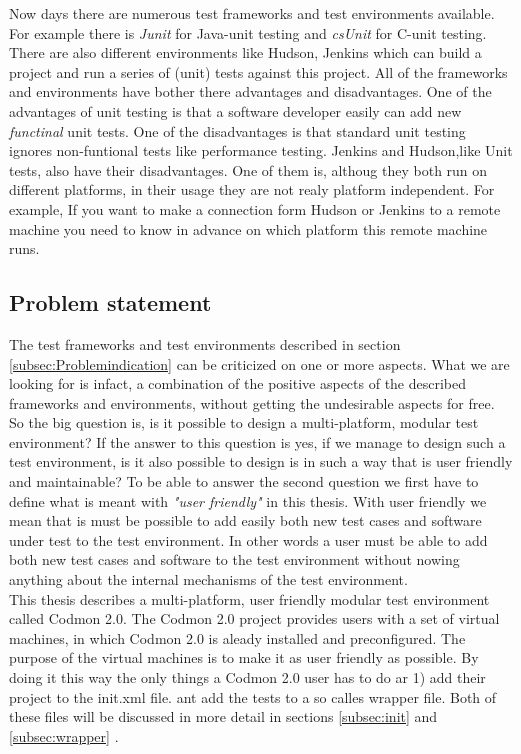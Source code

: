 \documentclass[a4paper,10pt]{scrartcl}
\newcommand{\project}{Codmon 2.0}
\newcommand{\CS}{C\nolinebreak\hspace{-.05em}\raisebox{.6ex}{\bf \#}}
\begin{document}
Now days there are numerous test frameworks and test environments available. For example there is \emph{Junit} for Java-unit testing and \emph{csUnit} for \CS{}-unit testing.
There are also different environments like Hudson, Jenkins which can build a project and run a series of (unit) tests against this project. All of the frameworks
and environments have bother there advantages and disadvantages. One of the advantages of unit testing is that a software developer easily can add new \emph{functinal} unit tests.
One of the disadvantages is that standard unit testing ignores non-funtional tests like performance testing. Jenkins and Hudson,like Unit tests, also have their
disadvantages. One of them is, althoug they both run on different platforms, in their usage they are not realy platform independent. For example, If you want
to make a connection form Hudson or Jenkins to a remote machine you need to know in advance on which platform this remote machine runs. 

\subsection{Problem statement}
\label{subsec:Problemstatement}
The test frameworks and test environments described in section \ref{subsec:Problemindication} can be criticized on one or more aspects. What we are looking for is infact, a combination
of the positive aspects of the described frameworks and environments, without getting the undesirable aspects for free. So the big question is, is it possible to design a
multi-platform, modular test environment? If the answer to this question is yes, if we manage to design such a test environment, is it also possible to design is in such a way
that is user friendly and maintainable? To be able to answer the second question we first have to define what is meant with \emph{"user friendly"} in this thesis.
With user friendly we mean that is must be possible to add easily both new test cases and software under test to the test environment. In other words a user must be able
to add both new test cases and software to the test environment without nowing anything about the internal mechanisms of the test environment.\\

\noindent This thesis describes a multi-platform, user friendly modular test environment called \project{}. The \project{} project provides users with a set of virtual machines,
in which \project{} is aleady installed and preconfigured. The purpose of the virtual machines is to make it as user friendly as possible. By doing it this way the only things
a \project{} user has to do ar 1) add their project  to the init.xml file. ant add the tests to a so calles wrapper file. Both of these files will be discussed in more detail in 
sections \ref{subsec:init} and \ref{subsec:wrapper} .
\end{document}
